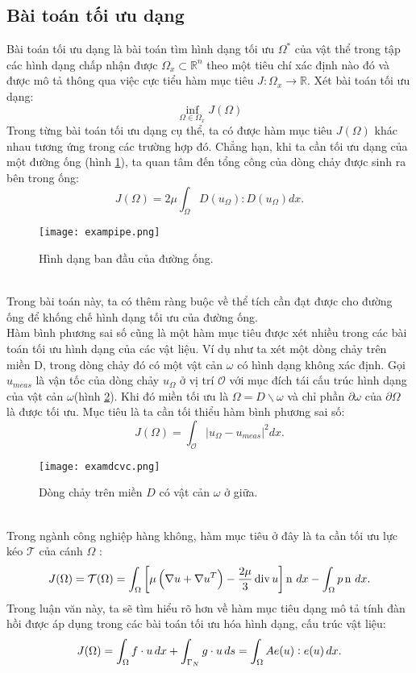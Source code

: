 \documentclass[
12pt, %
oneside, %
english, %
onehalfspacing, %
nolistspacing, %
headsepline, %
addchap,
]{MastersDoctoralThesis} %
\begin{document}
\subsection{Bài toán tối ưu dạng}
Bài toán tối ưu dạng là bài toán tìm hình dạng tối ưu $\Omega^*$ của vật thể trong tập các hình dạng chấp nhận được $\Omega_x\subset\mathbb{R}^n$ theo một tiêu chí xác định nào đó và được mô tả thông qua việc cực tiểu hàm mục tiêu $J:\Omega_x\rightarrow\mathbb{R}$. Xét bài toán tối ưu dạng:
\begin{equation}\label{bt:toiuidang}
\inf_{\Omega\in\Omega_x}J(\Omega)
\end{equation}
Trong từng bài toán tối ưu dạng cụ thể, ta có được hàm mục tiêu $J(\Omega)$ khác nhau tương ứng trong các trường hợp đó. Chẳng hạn, khi ta cần tối ưu dạng của một đường ống (hình \ref{fig:exampipe}), ta quan tâm đến tổng công của dòng chảy được sinh ra bên trong ống:
$$J(\Omega) = 2\mu\int_\Omega D(u_\Omega):D(u_\Omega)dx.$$
\begin{figure}[http]
\centering
\texttt{[image: exampipe.png]}
\caption{Hình dạng ban đầu của đường ống.}
\label{fig:exampipe}
\end{figure}\\
Trong bài toán này, ta có thêm ràng buộc về thể tích cần đạt được cho đường ống để khống chế hình dạng tối ưu của đường ống.\\
Hàm bình phương sai số cũng là một hàm mục tiêu được xét nhiều trong các bài toán tối ưu hình dạng của các vật liệu. Ví dụ như ta xét một dòng chảy trên miền D, trong dòng chảy đó có một vật cản $\omega$ có hình dạng không xác định. Gọi $u_{meas}$ là vận tốc của dòng chảy $u_\Omega$ ở vị trí $\mathcal{O}$ với mục đích  tái cấu trúc hình dạng của vật cản $\omega$(hình \ref{fig:examdcvc}). Khi đó miền tối ưu là $\Omega = D\backslash\omega$ và chỉ phần $\partial\omega$ của $\partial\Omega$ là được tối ưu. Mục tiêu là ta cần tối thiểu hàm bình phương sai số:
$$J(\Omega)=\int_\mathcal{O}|u_\Omega - u_{meas}|^2dx.$$
\begin{figure}[http]
\centering
\texttt{[image: examdcvc.png]}
\caption{Dòng chảy trên miền $D$ có vật cản $\omega$ ở giữa.}
\label{fig:examdcvc}
\end{figure}\\
Trong ngành công nghiệp hàng không, hàm mục tiêu ở đây là ta cần tối ưu lực kéo $\mathcal{T}$ của cánh $\Omega$ \cite{Pir84, MP10}:
$$J(\Omega)=\mathcal{T}(\Omega)=\int_\Omega \left[\mu \left(\nabla u + \nabla u^T\right) - \frac{2\mu}{3} \operatorname{div} u \right]\operatorname{n} \,dx  - \int_\Omega p\operatorname{n} \,dx.$$
Trong luận văn này, ta sẽ tìm hiểu rõ hơn về hàm mục tiêu dạng mô tả tính đàn hồi được áp dụng trong các bài toán tối ưu hóa hình dạng, cấu trúc vật liệu:
$$J(\Omega)=\int_\Omega f\cdot u\,dx + \int_{\Gamma_N} g \cdot u \,ds = \int_{\Omega} Ae(u):e(u)\,dx.$$
\end{document}

